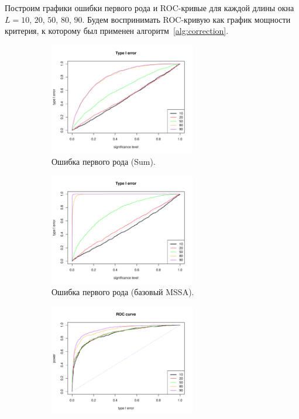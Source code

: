 \documentclass[specialist,
substylefile = spbu_report.rtx,
subf,href,colorlinks=true, 12pt]{disser}
\theoremstyle{definition}
\begin{document}
Построим графики ошибки первого рода и ROC-кривые для каждой длины окна $L=10$, $20$, $50$, $80$, $90$. Будем воспринимать ROC-кривую как график мощности критерия, к которому был применен алгоритм~\ref{alg:correction}.
\begin{figure}[h!]
	\captionsetup[subfigure]{justification=Centering}
	\begin{subfigure}[t]{0.45\textwidth}
		\centering
		\includegraphics[width=0.7\textwidth]{img/type1error_sum_ev.pdf}
		\caption{Ошибка первого рода (Sum).}
		\label{fig:sum_ev_a}
	\end{subfigure}\hspace{\fill}
	\begin{subfigure}[t]{0.45\textwidth}
		\centering
		\includegraphics[width=0.7\textwidth]{img/type1error_mssa_ev.pdf}
		\caption{Ошибка первого рода (базовый MSSA).}
	\end{subfigure}
	\bigskip
	\begin{subfigure}[t]{0.45\textwidth}
		\centering
		\includegraphics[width=0.7\textwidth]{img/roc_sum_ev.pdf}

\end{subfigure}
\end{figure}
\end{document}
